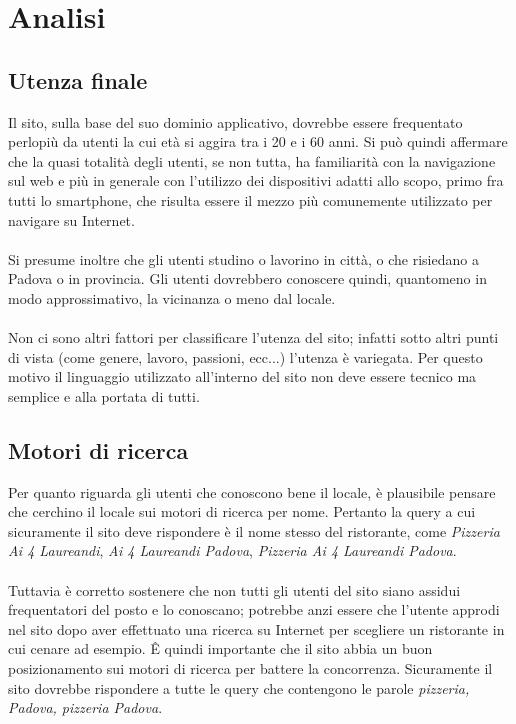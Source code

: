 \section{Analisi}

\subsection{Utenza finale}
Il sito, sulla base del suo dominio applicativo, dovrebbe essere frequentato perlopiù da utenti la cui età
si aggira tra i 20 e i 60 anni. Si può quindi affermare
che la quasi totalità degli utenti, se non tutta, ha familiarità con la navigazione sul web e più in
generale con l'utilizzo dei dispositivi adatti allo scopo, primo fra tutti lo smartphone, che risulta
essere il mezzo più comunemente utilizzato per navigare su Internet.\\
\\
Si presume inoltre che gli utenti studino o lavorino in città, o che risiedano a Padova o in provincia. Gli 
utenti dovrebbero conoscere quindi, quantomeno in modo approssimativo, la vicinanza o meno dal locale.\\
\\
Non ci sono altri fattori per classificare l'utenza del sito; infatti sotto altri punti di vista (come
genere, lavoro, passioni, ecc...) l'utenza è variegata. Per questo motivo il linguaggio utilizzato
all'interno del sito non deve essere tecnico ma semplice e alla portata di tutti.

\subsection{Motori di ricerca}
Per quanto riguarda gli utenti che conoscono bene il locale, è plausibile pensare che cerchino il
locale sui motori di ricerca per nome. Pertanto la query a cui sicuramente il sito deve rispondere è
il nome stesso del ristorante, come \textit{Pizzeria Ai 4 Laureandi}, \textit{Ai 4 Laureandi Padova},
\textit{Pizzeria Ai 4 Laureandi Padova}.\\
\\
Tuttavia è corretto sostenere che non tutti gli utenti del sito siano assidui frequentatori del posto e lo
conoscano; potrebbe anzi essere che l'utente approdi nel sito dopo aver effettuato una ricerca su Internet
per scegliere un ristorante in cui cenare ad esempio. Ê quindi importante che il sito abbia
un buon posizionamento sui motori di ricerca per battere la concorrenza. Sicuramente il sito dovrebbe
rispondere a tutte le query che contengono le parole \textit{pizzeria, Padova, pizzeria Padova}.

